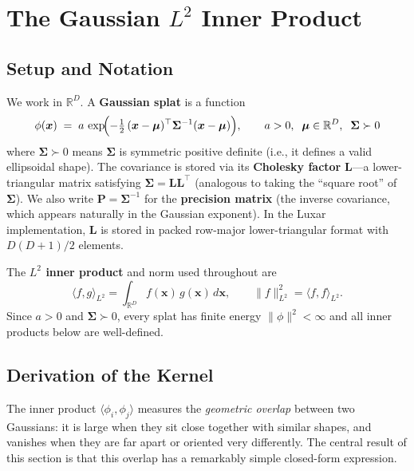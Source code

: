 \documentclass[11pt, a4paper]{article}
\theoremstyle{plain}
\theoremstyle{definition}
\theoremstyle{remark}
\newcommand{\R}{\mathbb{R}}
\newcommand{\bx}{\bm{x}}
\newcommand{\bmu}{\bm{\mu}}
\newcommand{\Sig}{\bm{\Sigma}}
\newcommand{\Lchol}{\bm{L}}
\newcommand{\Prec}{\bm{P}}
\begin{document}
\section{The Gaussian \texorpdfstring{$L^2$}{L2} Inner Product}\label{sec:kernel}

\subsection{Setup and Notation}

We work in $\R^D$.  A \textbf{Gaussian splat} is a function
\begin{equation}\label{eq:splat_def}
  \phi(\bx) \;=\; a \,\exp\!\Bigl(
    -\tfrac{1}{2}\,(\bx - \bmu)^\top \Sig^{-1} (\bx - \bmu)
  \Bigr),
  \qquad a > 0,\;\; \bmu \in \R^D,\;\;
  \Sig \succ 0
\end{equation}
where $\Sig \succ 0$ means $\Sig$ is symmetric positive definite
(i.e., it defines a valid ellipsoidal shape).
The covariance is stored via its \textbf{Cholesky factor}
$\Lchol$---a lower-triangular matrix satisfying
$\Sig = \Lchol\Lchol^\top$ (analogous to taking the ``square root''
of $\Sig$).  We also write $\Prec = \Sig^{-1}$ for the
\textbf{precision matrix} (the inverse covariance, which appears
naturally in the Gaussian exponent).  In the Luxar implementation,
$\Lchol$ is stored in packed row-major lower-triangular format with
$D(D{+}1)/2$ elements.

The \textbf{$L^2$ inner product} and norm used throughout are
\begin{equation}\label{eq:l2_ip}
  \langle f, g \rangle_{L^2}
  = \int_{\R^D} f(\bx)\,g(\bx)\,d\bx,
  \qquad
  \|f\|_{L^2}^2 = \langle f, f \rangle_{L^2}.
\end{equation}
Since $a > 0$ and $\Sig \succ 0$, every splat has finite energy
$\|\phi\|^2 < \infty$ and all inner products below are well-defined.

\subsection{Derivation of the Kernel}

The inner product $\langle\phi_i, \phi_j\rangle$ measures the
\emph{geometric overlap} between two Gaussians: it is large when
they sit close together with similar shapes, and vanishes when they
are far apart or oriented very differently.  The central result of
this section is that this overlap has a remarkably simple
closed-form expression.
\end{document}

